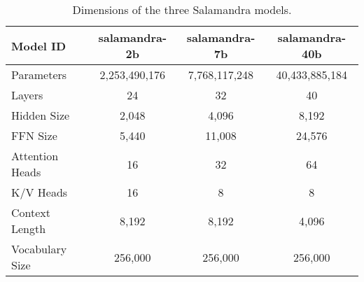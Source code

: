 \begin{comment}
\begin{table}[ht!]
\centering
\small
\resizebox{\textwidth}{!}{
\begin{tabular}{@{}cccccccc@{}}
\toprule
Parameters & Layers & Hidden size & FFN size & Att. Heads & K/V Heads & Context Length & Vocab. size \\
\midrule
2,253,490,176  & 24 & 2,048 & 5,440  & 16 & 16 & 8,192 & 256,000 \\
7,768,117,248  & 32 & 4,096 & 11,008 & 32 & 8  & 8,192 & 256,000 \\
40,433,885,184 & 40 & 8,192 & 24,576 & 64 & 8  & 4,096 & 256,000 \\ \bottomrule
\end{tabular}
}
\caption{Dimensions of the three Salamandra models.}
\label{tab:model_dimensions}
\end{table}
\end{comment}

\begin{table}[ht!]
\centering
\small
\begin{tabular}{lccc}
\toprule
Model ID & \textbf{salamandra-2b} & \textbf{salamandra-7b} & \textbf{salamandra-40b} \\
\midrule
Parameters & 2,253,490,176  & 7,768,117,248  & 40,433,885,184 \\
Layers & 24 & 32 & 40 \\
Hidden Size & 2,048 & 4,096 & 8,192 \\
FFN Size & 5,440 & 11,008 & 24,576 \\
Attention Heads & 16 & 32 & 64 \\
K/V Heads & 16 & 8  & 8 \\
Context Length & 8,192 & 8,192 & 4,096 \\
Vocabulary Size & 256,000 & 256,000 & 256,000 \\ \bottomrule
\end{tabular}
\caption{Dimensions of the three Salamandra models.}
\label{tab:model_dimensions}
\end{table}